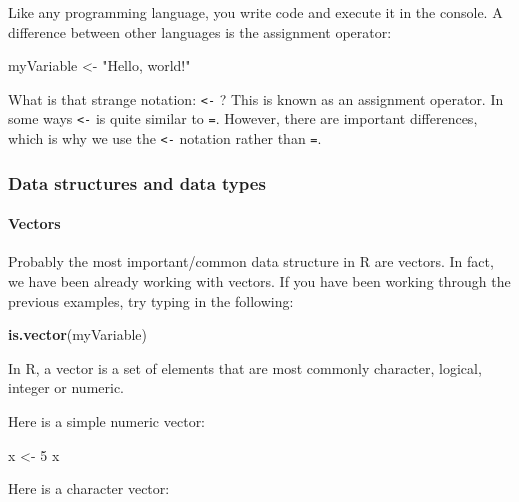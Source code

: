 \documentclass[]{article}
\newenvironment{Shaded}{\begin{snugshade}}{\end{snugshade}}
\newcommand{\DecValTok}[1]{\textcolor[rgb]{0.00,0.00,0.81}{#1}}
\newcommand{\KeywordTok}[1]{\textcolor[rgb]{0.13,0.29,0.53}{\textbf{#1}}}
\newcommand{\NormalTok}[1]{#1}
\newcommand{\StringTok}[1]{\textcolor[rgb]{0.31,0.60,0.02}{#1}}
\let\oldparagraph\paragraph
\renewcommand{\paragraph}[1]{\oldparagraph{#1}\mbox{}}
\begin{document}
Like any programming language, you write code and execute it in the
console. A difference between other languages is the assignment
operator:

\begin{Shaded}
\begin{Highlighting}[]
\NormalTok{myVariable <-}\StringTok{ "Hello, world!"}
\end{Highlighting}
\end{Shaded}

What is that strange notation: \texttt{\textless{}-} ? This is known as
an assignment operator. In some ways \texttt{\textless{}-} is quite
similar to \texttt{=}. However, there are important differences, which
is why we use the \texttt{\textless{}-} notation rather than \texttt{=}.

\hypertarget{data-structures-and-data-types}{%
\subsubsection{Data structures and data
types}\label{data-structures-and-data-types}}

\hypertarget{vectors}{%
\paragraph{Vectors}\label{vectors}}

Probably the most important/common data structure in R are vectors. In
fact, we have been already working with vectors. If you have been
working through the previous examples, try typing in the following:

\begin{Shaded}
\begin{Highlighting}[]
\KeywordTok{is.vector}\NormalTok{(myVariable)}
\end{Highlighting}
\end{Shaded}

In R, a vector is a set of elements that are most commonly character,
logical, integer or numeric.

Here is a simple numeric vector:

\begin{Shaded}
\begin{Highlighting}[]
\NormalTok{x <-}\StringTok{ }\DecValTok{5}
\NormalTok{x}
\end{Highlighting}
\end{Shaded}

Here is a character vector:
\end{document}
